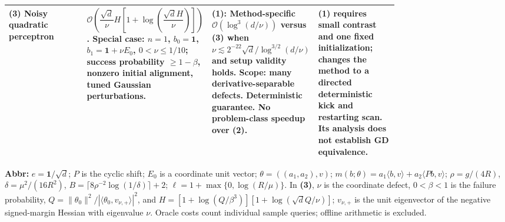 \begin{table}[tp]
\begin{threeparttable}
\begin{tabularx}{\linewidth}{@{}>{\raggedright\arraybackslash}p{0.20\linewidth}>{\raggedright\arraybackslash}p{0.32\linewidth}>{\raggedright\arraybackslash}p{0.25\linewidth}>{\raggedright\arraybackslash}X@{}}
\midrule
\textbf{(3)} Noisy quadratic perceptron \citep[Thm.~5.1, v2]{mscpTyurin2026v2}
& $\mathcal{O}\!\left(\dfrac{\sqrt d}{\nu}H\left[1+\log\!\left(\dfrac{\sqrt d H}{\nu}\right)\right]\right)$.
Special case: $n=1$, $b_0=\mathbf1$, $b_1=\mathbf1+\nu E_0$, $0<\nu\le1/10$; success probability $\ge1-\beta$, nonzero initial alignment, tuned Gaussian perturbations.
& \textbf{(1)}: Method-specific $\mathcal{O}(\log^3(d/\nu))$ versus \textbf{(3)} when $\nu\lesssim2^{-22}\sqrt d/\log^{3/2}(d/\nu)$ and setup validity holds. Scope: many derivative-separable defects. Deterministic guarantee. No problem-class speedup over \textbf{(2)}.
& \textbf{(1)} requires small contrast and one fixed initialization; changes the method to a directed deterministic kick and restarting scan. Its analysis does not establish GD equivalence. \\
\bottomrule
\end{tabularx}
\begin{tablenotes}[flushleft]\footnotesize
\item[] \textbf{Abbr:} $e=\mathbf1/\sqrt d$; $P$ is the cyclic shift; $E_0$ is a coordinate unit vector; $\theta=((a_1,a_2),v)$; $m(b;\theta)=a_1\langle b,v\rangle+a_2\langle Pb,v\rangle$; $\rho=g/(4R)$, $\delta=\mu^2/(16R^2)$, $B=\lceil8\rho^{-2}\log(1/\delta)\rceil+2$; $\ell=1+\max\{0,\log(R/\mu)\}$. In \textbf{(3)}, $\nu$ is the coordinate defect, $0<\beta<1$ is the failure probability, $Q=\|\theta_0\|^2/|\langle\theta_0,v_{\nu,+}\rangle|^2$, and $H=[1+\log(Q/\beta^3)][1+\log(\sqrt d Q/\nu)]$; $v_{\nu,+}$ is the unit eigenvector of the negative signed-margin Hessian with eigenvalue $\nu$. Oracle costs count individual sample queries; offline arithmetic is excluded.
\end{tablenotes}
\end{threeparttable}
\end{table}
